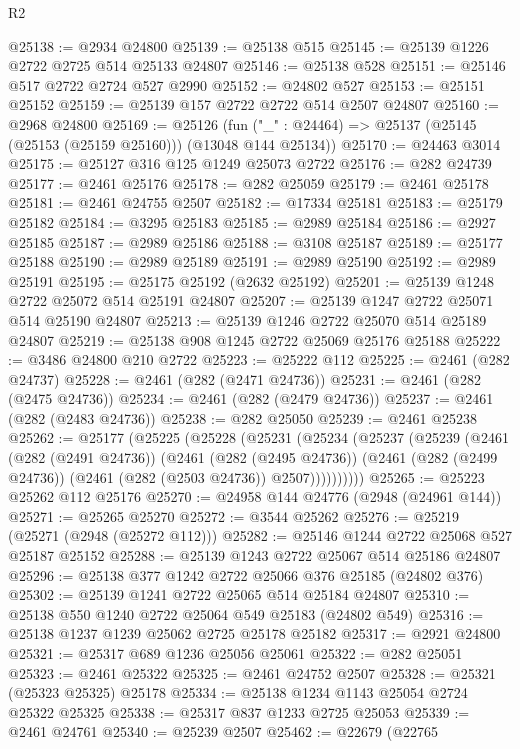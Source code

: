 \begin{lexlean}{R2}
\begin{coremodule}
@25138 := @2934 @24800
@25139 := @25138 @515
@25145 := @25139 @1226 @2722 @2725 @514 @25133 @24807
@25146 := @25138 @528
@25151 := @25146 @517 @2722 @2724 @527 @2990
@25152 := @24802 @527
@25153 := @25151 @25152
@25159 := @25139 @157 @2722 @2722 @514 @2507 @24807
@25160 := @2968 @24800
@25169 := @25126
    (fun ("_" : @24464) => @25137 (@25145 (@25153 (@25159 @25160))) (@13048 @144 @25134))
@25170 := @24463 @3014
@25175 := @25127 @316 @125 @1249 @25073 @2722
@25176 := @282 @24739
@25177 := @2461 @25176
@25178 := @282 @25059
@25179 := @2461 @25178
@25181 := @2461 @24755 @2507
@25182 := @17334 @25181
@25183 := @25179 @25182
@25184 := @3295 @25183
@25185 := @2989 @25184
@25186 := @2927 @25185
@25187 := @2989 @25186
@25188 := @3108 @25187
@25189 := @25177 @25188
@25190 := @2989 @25189
@25191 := @2989 @25190
@25192 := @2989 @25191
@25195 := @25175 @25192 (@2632 @25192)
@25201 := @25139 @1248 @2722 @25072 @514 @25191 @24807
@25207 := @25139 @1247 @2722 @25071 @514 @25190 @24807
@25213 := @25139 @1246 @2722 @25070 @514 @25189 @24807
@25219 := @25138 @908 @1245 @2722 @25069 @25176 @25188
@25222 := @3486 @24800 @210 @2722
@25223 := @25222 @112
@25225 := @2461 (@282 @24737)
@25228 := @2461 (@282 (@2471 @24736))
@25231 := @2461 (@282 (@2475 @24736))
@25234 := @2461 (@282 (@2479 @24736))
@25237 := @2461 (@282 (@2483 @24736))
@25238 := @282 @25050
@25239 := @2461 @25238
@25262 := @25177
    (@25225
      (@25228
        (@25231
          (@25234
            (@25237
              (@25239
                (@2461
                  (@282 (@2491 @24736))
                  (@2461
                    (@282 (@2495 @24736))
                    (@2461 (@282 (@2499 @24736)) (@2461 (@282 (@2503 @24736)) @2507))))))))))
@25265 := @25223 @25262 @112 @25176
@25270 := @24958 @144 @24776 (@2948 (@24961 @144))
@25271 := @25265 @25270
@25272 := @3544 @25262
@25276 := @25219 (@25271 (@2948 (@25272 @112)))
@25282 := @25146 @1244 @2722 @25068 @527 @25187 @25152
@25288 := @25139 @1243 @2722 @25067 @514 @25186 @24807
@25296 := @25138 @377 @1242 @2722 @25066 @376 @25185 (@24802 @376)
@25302 := @25139 @1241 @2722 @25065 @514 @25184 @24807
@25310 := @25138 @550 @1240 @2722 @25064 @549 @25183 (@24802 @549)
@25316 := @25138 @1237 @1239 @25062 @2725 @25178 @25182
@25317 := @2921 @24800
@25321 := @25317 @689 @1236 @25056 @25061
@25322 := @282 @25051
@25323 := @2461 @25322
@25325 := @2461 @24752 @2507
@25328 := @25321 (@25323 @25325) @25178
@25334 := @25138 @1234 @1143 @25054 @2724 @25322 @25325
@25338 := @25317 @837 @1233 @2725 @25053
@25339 := @2461 @24761
@25340 := @25239 @2507
@25462 := @22679
    (@22765

\end{coremodule}
\end{lexlean}
